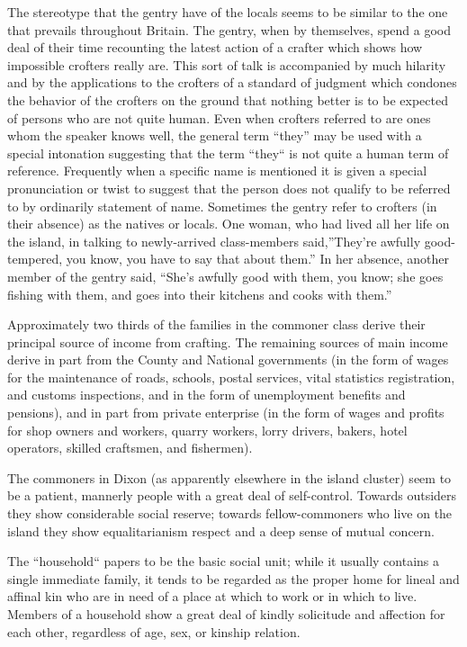 \documentclass[openany,nobib]{tufte-book}
\begin{document}
The stereotype that the gentry have of the locals seems to be similar to
the one that prevails throughout Britain. The gentry, when by
themselves, spend a good deal of their time recounting the latest action
of a crafter which shows how impossible crofters really are. This sort
of talk is accompanied by much hilarity and by the applications to the
crofters of a standard of judgment which condones the behavior of the
crofters on the ground that nothing better is to be expected of persons
who are not quite human. Even when crofters referred to are ones whom
the speaker knows well, the general term ``they'' may be used with a
special intonation suggesting that the term ``they`` is not quite a
human term of reference. Frequently when a specific name is mentioned it
is given a special pronunciation or twist to suggest that the person
does not qualify to be referred to by ordinarily statement of name.
Sometimes the gentry refer to crofters (in their absence) as the natives
or locals. One woman, who had lived all her life on the island, in
talking to newly-arrived class-members said,''They're awfully
good-tempered, you know, you have to say that about them.'' In her
absence, another member of the gentry said, ``She's awfully good with
them, you know; she goes fishing with them, and goes into their kitchens
and cooks with them.''

Approximately two thirds of the families in the commoner class derive
their principal source of income from crafting. The remaining sources of
main income derive in part from the County and National governments (in
the form of wages for the maintenance of roads, schools, postal
services, vital statistics registration, and customs inspections, and in
the form of unemployment benefits and pensions), and in part from
private enterprise (in the form of wages and profits for shop owners and
workers, quarry workers, lorry drivers, bakers, hotel operators, skilled
craftsmen, and fishermen).

The commoners in Dixon (as apparently elsewhere in the island cluster)
seem to be a patient, mannerly people with a great deal of self-control.
Towards outsiders they show considerable social reserve; towards
fellow-commoners who live on the island they show equalitarianism
respect and a deep sense of mutual concern.

The ``household`` papers to be the basic social unit; while it usually
contains a single immediate family, it tends to be regarded as the
proper home for lineal and affinal kin who are in need of a place at
which to work or in which to live. Members of a household show a great
deal of kindly solicitude and affection for each other, regardless of
age, sex, or kinship relation.
\end{document}
